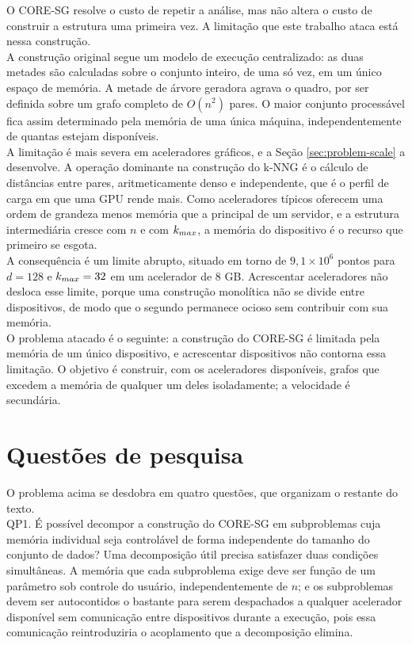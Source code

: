 O \ac{CORE-SG} resolve o custo de repetir a análise, mas não altera o custo de construir a estrutura uma primeira vez. A limitação que este trabalho ataca está nessa construção.\\

A construção original segue um modelo de execução centralizado: as duas metades são calculadas sobre o conjunto inteiro, de uma só vez, em um único espaço de memória. A metade de árvore geradora agrava o quadro, por ser definida sobre um grafo completo de $O(n^2)$ pares. O maior conjunto processável fica assim determinado pela memória de uma única máquina, independentemente de quantas estejam disponíveis.\\

A limitação é mais severa em aceleradores gráficos, e a Seção \ref{sec:problem-scale} a desenvolve. A operação dominante na construção do \ac{k-NNG} é o cálculo de distâncias entre pares, aritmeticamente denso e independente, que é o perfil de carga em que uma \ac{GPU} rende mais. Como aceleradores típicos oferecem uma ordem de grandeza menos memória que a principal de um servidor, e a estrutura intermediária cresce com $n$ e com $k_{max}$, a memória do dispositivo é o recurso que primeiro se esgota.\\

A consequência é um limite abrupto, situado em torno de $9{,}1 \times 10^6$ pontos para $d = 128$ e $k_{max} = 32$ em um acelerador de 8 GB. Acrescentar aceleradores não desloca esse limite, porque uma construção monolítica não se divide entre dispositivos, de modo que o segundo permanece ocioso sem contribuir com sua memória.\\

O problema atacado é o seguinte: a construção do \ac{CORE-SG} é limitada pela memória de um único dispositivo, e acrescentar dispositivos não contorna essa limitação. O objetivo é construir, com os aceleradores disponíveis, grafos que excedem a memória de qualquer um deles isoladamente; a velocidade é secundária.\\

\section{Questões de pesquisa\label{sec:research-questions}}

O problema acima se desdobra em quatro questões, que organizam o restante do texto.\\

QP1. É possível decompor a construção do \ac{CORE-SG} em subproblemas cuja memória individual seja controlável de forma independente do tamanho do conjunto de dados? Uma decomposição útil precisa satisfazer duas condições simultâneas. A memória que cada subproblema exige deve ser função de um parâmetro sob controle do usuário, independentemente de $n$; e os subproblemas devem ser autocontidos o bastante para serem despachados a qualquer acelerador disponível sem comunicação entre dispositivos durante a execução, pois essa comunicação reintroduziria o acoplamento que a decomposição elimina.\\

